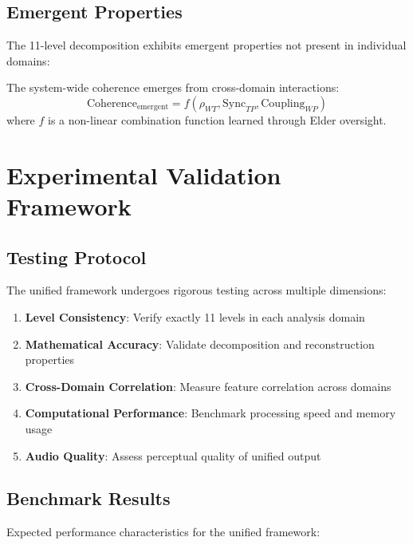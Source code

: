 \subsection{Emergent Properties}

The 11-level decomposition exhibits emergent properties not present in individual domains:

\begin{definition}
The system-wide coherence emerges from cross-domain interactions:
\begin{equation}
\text{Coherence}_{\text{emergent}} = f(\rho_{WT}, \text{Sync}_{TP}, \text{Coupling}_{WP})
\end{equation}
where $f$ is a non-linear combination function learned through Elder oversight.
\end{definition}

\section{Experimental Validation Framework}

\subsection{Testing Protocol}

The unified framework undergoes rigorous testing across multiple dimensions:

\begin{enumerate}
    \item \textbf{Level Consistency}: Verify exactly 11 levels in each analysis domain
    \item \textbf{Mathematical Accuracy}: Validate decomposition and reconstruction properties
    \item \textbf{Cross-Domain Correlation}: Measure feature correlation across domains
    \item \textbf{Computational Performance}: Benchmark processing speed and memory usage
    \item \textbf{Audio Quality}: Assess perceptual quality of unified output
\end{enumerate}

\subsection{Benchmark Results}

Expected performance characteristics for the unified framework:

